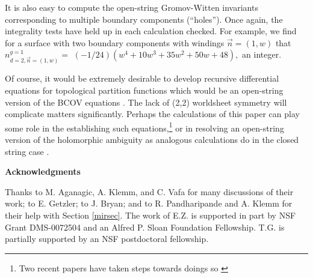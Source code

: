 \documentclass[a4paper,11pt]{article}
\begin{document}
It is also easy to compute the
open-string Gromov-Witten
invariants corresponding to multiple boundary components
(``holes'').  Once again, the integrality tests have
held up in each calculation checked.
For example, we find for a surface with two boundary
components with windings $\vec{n}=(1,w)$ that
$n^{g=1}_{d=2,\vec{n}=(1,w)} =$
$(-1/24)(w^4+10w^3+35w^2+50w+48),$ an integer.

Of course, it would be extremely desirable to develop
recursive
differential equations for topological partition functions
which would be an open-string version of the BCOV equations
\cite{BCOV}.
The lack of (2,2) worldsheet symmetry will complicate
matters significantly.
Perhaps the calculations of this paper can
play some role in the establishing
such equations,\footnote{Two recent papers have
taken steps towards doings so \cite{GJS}
\cite{M}} or in
resolving an open-string version
of the holomorphic ambiguity
as analogous calculations
do in the closed string case \cite{KZ}.

\vskip0.2in
\centerline{\bf Acknowledgments}
\vskip0.1in
Thanks to M. Aganagic, A. Klemm, and C. Vafa for
many discussions of their work; to E. Getzler; to J. Bryan;
and to R. Pandharipande
and A. Klemm for their help with Section \ref{mirsec}.
The work of E.Z.
is supported in part by NSF Grant DMS-0072504 and
an Alfred P. Sloan Foundation Fellowship. T.G. is
partially supported by an NSF postdoctoral fellowship.
\end{document}
